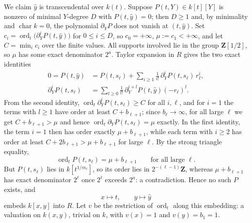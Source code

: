 \begin{example}
We claim $\hat y$ is transcendental over $k(t)$. Suppose
$P(t,Y)\in k[t][Y]$ is nonzero of minimal $Y$-degree $D$ with
$P(t,\hat y)=0$; then $D\geq1$ and, by minimality and
$\operatorname{char}k=0$, the polynomial
$\partial_YP$ does not vanish at $(t,\hat y)$. Set
$c_i=\operatorname{ord}_t\bigl(\partial_Y^iP(t,\hat y)\bigr)$ for
$0\leq i\leq D$, so $c_0=+\infty$,
$\mu:=c_1<+\infty$, and let $C=\min_ic_i$ over the finite values. All
supports involved lie in the group $\mathbf Z[1/2]$, so
$\mu$ has some exact denominator $2^{a}$. Taylor expansion in $R$ gives
the two exact identities
\[
 \begin{aligned}
  0=P(t,\hat y)
   &=P(t,s_\ell)
     +\sum_{i\geq1}\tfrac1{i!}\,\partial_Y^iP(t,s_\ell)\,r_\ell^i,\\
  \partial_Y^iP(t,s_\ell)
   &=\sum_{l\geq0}\tfrac1{l!}\,
     \partial_Y^{i+l}P(t,\hat y)(-r_\ell)^l .
 \end{aligned}
\]
From the second identity,
$\operatorname{ord}_t\partial_Y^iP(t,s_\ell)\geq C$ for all $i,\ell$,
and for $i=1$ the terms with $l\geq1$ have order at least
$C+b_{\ell+1}$; since $b_\ell\to\infty$, for all large $\ell$ we get
$C+b_{\ell+1}>\mu$ and hence
$\operatorname{ord}_t\partial_YP(t,s_\ell)=\mu$ exactly. In the first
identity, the term $i=1$ then has order exactly $\mu+b_{\ell+1}$, while
each term with $i\geq2$ has order at least $C+2b_{\ell+1}>\mu+b_{\ell+1}$
for large $\ell$. By the strong triangle equality,
\[
 \operatorname{ord}_tP(t,s_\ell)=\mu+b_{\ell+1}
 \qquad\text{for all large }\ell .
\]
But $P(t,s_\ell)$ lies in $k[t^{1/m_\ell}]$, so its order lies in
$2^{-(\ell-1)}\mathbf Z$, whereas $\mu+b_{\ell+1}$ has exact denominator
$2^{\ell}$ once $2^\ell$ exceeds $2^{a}$: a contradiction. Hence no such
$P$ exists, and
\[
 x\mapsto t,\qquad y\mapsto\hat y
\]
embeds $k[x,y]$ into $R$. Let $v$ be the restriction of
$\operatorname{ord}_t$ along this embedding: a valuation on $k(x,y)$,
trivial on $k$, with $v(x)=1$ and $v(y)=b_1=1$.


\end{example}
